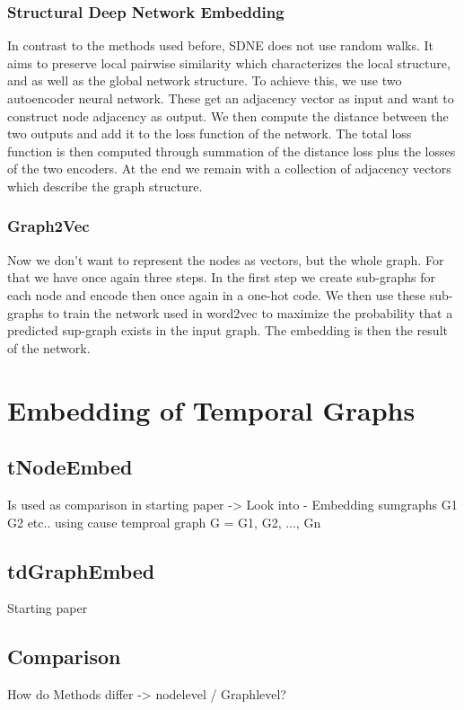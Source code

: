 \documentclass[sigconf]{acmart}
\begin{document}
\subsubsection{Structural Deep Network Embedding}
In contrast to the methods used before, SDNE does not use random walks. It aims to preserve local pairwise similarity which characterizes the local structure, and 
as well as the global network structure.
To achieve this, we use two autoencoder neural network. These get an adjacency vector as input and want to construct node adjacency as output.
We then compute the distance between the two outputs and add it to the loss function of the network.
The total loss function is then computed through summation of the distance loss plus the losses of the two encoders.
At the end we remain with a collection of adjacency vectors which describe the graph structure.

\subsubsection{Graph2Vec}
Now we don't want to represent the nodes as vectors, but the whole graph. For that we have once again three steps. 
In the first step we create sub-graphs for each node and encode then once again in a one-hot code. We then use these sub-graphs to train the network used in 
word2vec to maximize the probability that a predicted sup-graph exists in the input graph. The embedding is then the result of the network.
\cite{Godec.31.12.2018}

\section{Embedding of Temporal Graphs}


\subsection{tNodeEmbed}
Is used as comparison in starting paper -> Look into
- Embedding sumgraphs G1 G2 etc.. using cause temproal graph G = {G1, G2, ..., Gn}
\cite{Singer.2019}


\subsection{tdGraphEmbed}
Starting paper
\cite{Beladev.2020}


\subsection{Comparison}
How do Methods differ -> nodelevel / Graphlevel?
\end{document}
